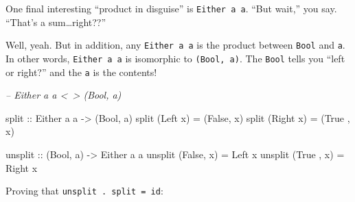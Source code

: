 \documentclass[]{article}
\newenvironment{Shaded}{}{}
\newcommand{\CommentTok}[1]{\textcolor[rgb]{0.38,0.63,0.69}{\textit{#1}}}
\newcommand{\DataTypeTok}[1]{\textcolor[rgb]{0.56,0.13,0.00}{#1}}
\newcommand{\FunctionTok}[1]{\textcolor[rgb]{0.02,0.16,0.49}{#1}}
\newcommand{\NormalTok}[1]{#1}
\newcommand{\OtherTok}[1]{\textcolor[rgb]{0.00,0.44,0.13}{#1}}
\begin{document}
One final interesting ``product in disguise'' is \texttt{Either\ a\ a}. ``But
wait,'' you say. ``That's a sum\ldots{}right??''

Well, yeah. But in addition, any \texttt{Either\ a\ a} is the product between
\texttt{Bool} and \texttt{a}. In other words, \texttt{Either\ a\ a} is
isomorphic to \texttt{(Bool,\ a)}. The \texttt{Bool} tells you ``left or
right?'' and the \texttt{a} is the contents!

\begin{Shaded}
\begin{Highlighting}[]
\CommentTok{-- Either a a <~> (Bool, a)}

\OtherTok{split ::} \DataTypeTok{Either}\NormalTok{ a a }\OtherTok{->}\NormalTok{ (}\DataTypeTok{Bool}\NormalTok{, a)}
\NormalTok{split (}\DataTypeTok{Left}\NormalTok{  x) }\FunctionTok{=}\NormalTok{ (}\DataTypeTok{False}\NormalTok{, x)}
\NormalTok{split (}\DataTypeTok{Right}\NormalTok{ x) }\FunctionTok{=}\NormalTok{ (}\DataTypeTok{True}\NormalTok{ , x)}

\OtherTok{unsplit ::}\NormalTok{ (}\DataTypeTok{Bool}\NormalTok{, a) }\OtherTok{->} \DataTypeTok{Either}\NormalTok{ a a}
\NormalTok{unsplit (}\DataTypeTok{False}\NormalTok{, x) }\FunctionTok{=} \DataTypeTok{Left}\NormalTok{  x}
\NormalTok{unsplit (}\DataTypeTok{True}\NormalTok{ , x) }\FunctionTok{=} \DataTypeTok{Right}\NormalTok{ x}
\end{Highlighting}
\end{Shaded}

Proving that \texttt{unsplit\ .\ split\ =\ id}:
\end{document}
